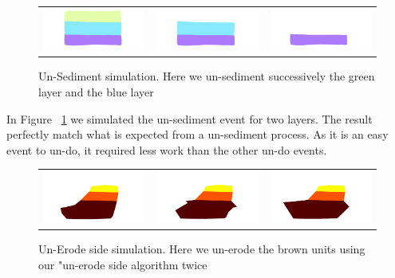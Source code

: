 \documentclass[12pt, a4paper]{report} %
\begin{document}
\begin{figure}[H]
\centering
\begin{tabular}{@{}ccc@{}}
\includegraphics[width=.36\textwidth]{sediment0.png}&
\includegraphics[width=.36\textwidth]{sediment1.png}&
\includegraphics[width=.36\textwidth]{sediment2.png}\\
\end{tabular}
\caption{Un-Sediment simulation. Here we un-sediment successively the green layer and the blue layer}
\label{sediment}
\end{figure}
In Figure ~\ref{sediment} we simulated the un-sediment event for two layers. The result perfectly match what is expected from a un-sediment process. As it is an easy event to un-do, it  required less work than the other un-do events.
\begin{figure}[H]
\centering
\begin{tabular}{@{}ccc@{}}
\includegraphics[width=.36\textwidth]{erodeSide0.png}&
\includegraphics[width=.36\textwidth]{erodeSide1.png}&
\includegraphics[width=.36\textwidth]{erodeSide2.png}\\
\end{tabular}
\caption{Un-Erode side simulation. Here we un-erode the brown units using our "un-erode side algorithm twice}
\label{erodeSide}
\end{figure}
\end{document}
